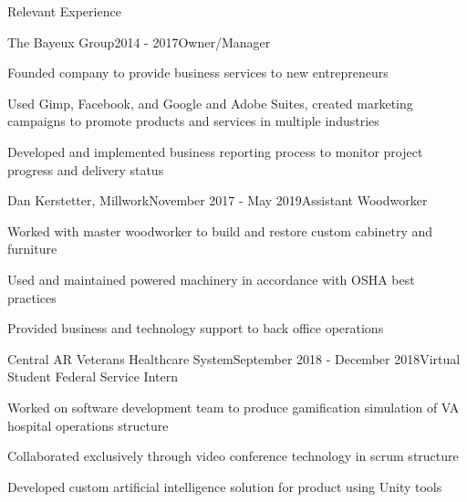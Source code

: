 \documentclass{resume} %
\begin{document}
\begin{rSection}{Relevant Experience}
\begin{rWorkSubsection}{The Bayeux Group}{2014 - 2017}{Owner/Manager}{}
\item Founded company to provide business services to new entrepreneurs
\item Used Gimp, Facebook, and Google and Adobe Suites, created marketing campaigns to promote products and services in multiple industries
\item Developed and implemented business reporting process to monitor project progress and delivery status
\end{rWorkSubsection}

\iffalse
\begin{rWorkSubsection}{Dan Kerstetter, Millwork}{November 2017 - May 2019}{Assistant Woodworker}{}
\item Worked with master woodworker to build and restore custom cabinetry and furniture
\item Used and maintained powered machinery in accordance with OSHA best practices
\item Provided business and technology support to back office operations
\end{rWorkSubsection}


\begin{rWorkSubsection}{Central AR Veterans Healthcare System}{September 2018 - December 2018}{Virtual Student Federal Service Intern}{}
\item Worked on software development team to produce gamification simulation of VA hospital operations structure
\item Collaborated exclusively through video conference technology in scrum structure
\item Developed custom artificial intelligence solution for product using Unity tools
\end{rWorkSubsection}


\end{rSection}
\end{document}
